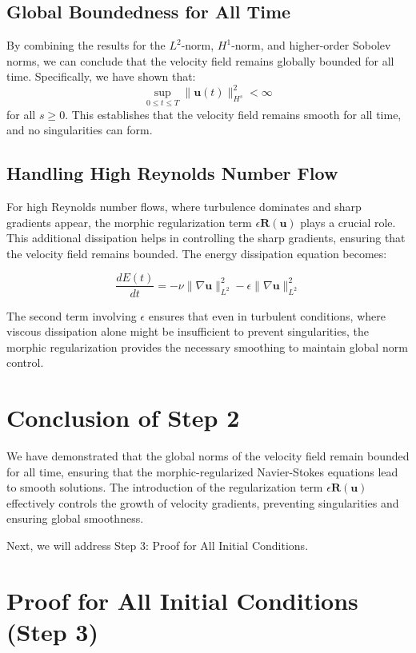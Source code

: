 \documentclass{article}
\begin{document}
\subsection*{Global Boundedness for All Time}

By combining the results for the \( L^2 \)-norm, \( H^1 \)-norm, and higher-order Sobolev norms, we can conclude that the velocity field remains globally bounded for all time. Specifically, we have shown that:
\[
\sup_{0 \leq t \leq T} \|\mathbf{u}(t)\|_{H^s}^2 < \infty
\]
for all \( s \geq 0 \). This establishes that the velocity field remains smooth for all time, and no singularities can form.

\subsection*{Handling High Reynolds Number Flow}

For high Reynolds number flows, where turbulence dominates and sharp gradients appear, the morphic regularization term \( \epsilon \mathbf{R}(\mathbf{u}) \) plays a crucial role. This additional dissipation helps in controlling the sharp gradients, ensuring that the velocity field remains bounded. The energy dissipation equation becomes:

\[
\frac{dE(t)}{dt} = -\nu \|\nabla \mathbf{u}\|_{L^2}^2 - \epsilon \|\nabla \mathbf{u}\|_{L^2}^2
\]

The second term involving \( \epsilon \) ensures that even in turbulent conditions, where viscous dissipation alone might be insufficient to prevent singularities, the morphic regularization provides the necessary smoothing to maintain global norm control.

\section*{Conclusion of Step 2}

We have demonstrated that the global norms of the velocity field remain bounded for all time, ensuring that the morphic-regularized Navier-Stokes equations lead to smooth solutions. The introduction of the regularization term \( \epsilon \mathbf{R}(\mathbf{u}) \) effectively controls the growth of velocity gradients, preventing singularities and ensuring global smoothness.

Next, we will address Step 3: Proof for All Initial Conditions.

\section*{Proof for All Initial Conditions (Step 3)}
\end{document}
